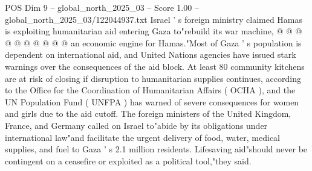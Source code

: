 \begin{textsample}{POS Dim 9 – global\_north\_2025\_03 – Score 1.00 – global\_north\_2025\_03/122044937.txt}
Israel ' s foreign ministry claimed Hamas is exploiting humanitarian aid entering Gaza to"rebuild its war machine, @ @ @ @ @ @ @ @ @ @ an economic engine for Hamas."Most of Gaza ' s population is dependent on international aid, and United Nations agencies have issued stark warnings over the consequences of the aid block.
At least 80 community kitchens are at risk of closing if disruption to humanitarian supplies continues, according to the Office for the Coordination of Humanitarian Affairs ( OCHA ), and the UN Population Fund ( UNFPA ) has warned of severe consequences for women and girls due to the aid cutoff.
The foreign ministers of the United Kingdom, France, and Germany called on Israel to"abide by its obligations under international law"and facilitate the urgent delivery of food, water, medical supplies, and fuel to Gaza ' s 2.1 million residents.
Lifesaving aid"should never be contingent on a ceasefire or exploited as a political tool,"they said.

\end{textsample}

